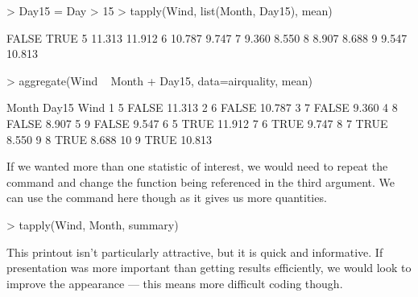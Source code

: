 \begin{Schunk}
\begin{Sinput}
> Day15 = Day > 15
> tapply(Wind, list(Month, Day15), mean) 
\end{Sinput}
\begin{Soutput}
   FALSE   TRUE
5 11.313 11.912
6 10.787  9.747
7  9.360  8.550
8  8.907  8.688
9  9.547 10.813
\end{Soutput}
\begin{Sinput}
> aggregate(Wind ~ Month + Day15, data=airquality, mean) 
\end{Sinput}
\begin{Soutput}
   Month Day15   Wind
1      5 FALSE 11.313
2      6 FALSE 10.787
3      7 FALSE  9.360
4      8 FALSE  8.907
5      9 FALSE  9.547
6      5  TRUE 11.912
7      6  TRUE  9.747
8      7  TRUE  8.550
9      8  TRUE  8.688
10     9  TRUE 10.813
\end{Soutput}
\end{Schunk}

 
If we wanted more than one statistic of interest, we would need to repeat the command and change the function being referenced in the third argument. We can use the  command here though as it gives us more quantities. 

\begin{Schunk}
\begin{Sinput}
> tapply(Wind, Month, summary) 
\end{Sinput}
\end{Schunk}

 
This printout isn't particularly attractive, but it is quick and informative. If presentation was more important than getting results efficiently, we would look to improve the appearance --- this means more difficult coding though. 
 
